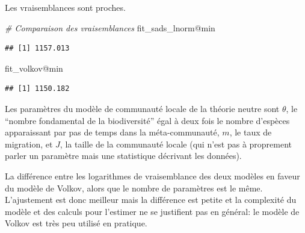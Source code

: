 \documentclass[
  11pt,
  american,
  a4paper,
  extrafontsizes,onecolumn,openright
  ]{memoir}
\makeatletter
\newenvironment{Shaded}{\begin{snugshade}}{\end{snugshade}}
\newcommand{\CommentTok}[1]{\textcolor[rgb]{0.56,0.35,0.01}{\textit{#1}}}
\newcommand{\NormalTok}[1]{#1}
\newcommand{\SpecialCharTok}[1]{\textcolor[rgb]{0.00,0.00,0.00}{#1}}
\newcommand{\MemoirChapStyle}{companion}
\newcommand{\MemoirPageStyle}{companion}
\newlength\widthw %
\newcommand*{\SmallMargins}{
  \setlrmarginsandblock{1.2in}{1.5in}{*}
  \setmarginnotes{0.1in}{0.1in}{0.1in}
 \setulmarginsandblock{1.5in}{1in}{*}
  \checkandfixthelayout
  \ch@ngetext
  \clearpage
  \setlength{\widthw}{\textwidth+\marginparsep+\marginparwidth}
  \footnotesatfoot
  \chapterstyle{\MemoirChapStyle}  %
  \pagestyle{\MemoirPageStyle}
}
\makeatother
\begin{document}
\normalsize

Les vraisemblances sont proches.

\scriptsize

\begin{Shaded}
\begin{Highlighting}[]
\CommentTok{\# Comparaison des vraisemblances}
\NormalTok{fit\_sads\_lnorm}\SpecialCharTok{@}\NormalTok{min}
\end{Highlighting}
\end{Shaded}

\begin{verbatim}
## [1] 1157.013
\end{verbatim}

\begin{Shaded}
\begin{Highlighting}[]
\NormalTok{fit\_volkov}\SpecialCharTok{@}\NormalTok{min}
\end{Highlighting}
\end{Shaded}

\begin{verbatim}
## [1] 1150.182
\end{verbatim}

\normalsize

Les paramètres du modèle de communauté locale de la théorie neutre sont \(\theta\), le \enquote{nombre fondamental de la biodiversité} égal à deux fois le nombre d'espèces apparaissant par pas de temps dans la méta-communauté, \(m\), le taux de migration, et \(J\), la taille de la communauté locale (qui n'est pas à proprement parler un paramètre mais une statistique décrivant les données).

La différence entre les logarithmes de vraisemblance des deux modèles en faveur du modèle de Volkov, alors que le nombre de paramètres est le même.
L'ajustement est donc meilleur mais la différence est petite et la complexité du modèle et des calculs pour l'estimer ne se justifient pas en général: le modèle de Volkov est très peu utilisé en pratique.



\backmatter
\SmallMargins

\twocolumn
\renewcommand*{\bibfont}{\scriptsize}
\printbibliography
\onecolumn






\end{document}
